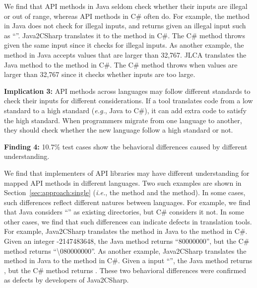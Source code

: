 We find that API methods in Java seldom check whether their inputs are illegal or out of range, whereas API methods in C\# often do. For example, the  method in Java does not check for illegal inputs, and returns  given an illegal input such as ``''. Java2CSharp translates it to the  method in C\#. The C\# method throws  given the same input since it checks for illegal inputs. As another example, the  method in Java accepts values that are larger than 32,767. JLCA translates the Java method to the  method in C\#. The C\# method throws  when values are larger than 32,767 since it checks whether inputs are too large.

\textbf{Implication 3:} API methods across languages may follow different standards to check their inputs for different considerations. If a tool translates code from a low standard to a high standard (\emph{e.g.}, Java to C\#), it can add extra code to satisfy the high standard. When programmers migrate from one language to another, they should check whether the new language follow a high standard or not.

\textbf{Finding 4:} 10.7\% test cases show the behavioral differences caused by different understanding.


We find that implementers of API libraries may have different understanding for mapped API methods in different languages. Two such examples are shown in Section~\ref{sec:approach:single} (\emph{i.e.}, the  method and the  method). In some cases, such differences reflect different natures between languages. For example, we find that Java considers ``\CodeIn{\textbackslash}'' as existing directories, but  C\# considers it not. In some other cases, we find that such differences can indicate defects in translation tools. For example, Java2CSharp translates the  method in Java to the  method in C\#.
Given an integer -2147483648, the Java method returns ``80000000'', but the C\# method returns ``\textbackslash080000000''. As another example, Java2CSharp translates the  method in Java to the  method in C\#. Given a input ``'', the Java method returns , but the C\# method returns . These two behavioral differences were confirmed as defects by developers of Java2CSharp.

